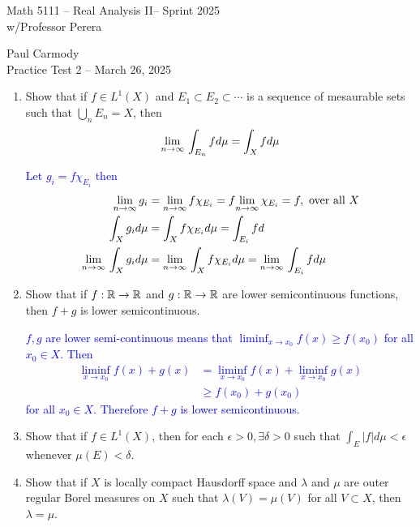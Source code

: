 \documentclass[10pt,a4paper]{report}
\newcommand{\CLASSNAME}{Math 5111 -- Real Analysis II}
\newcommand{\STUDENTNAME}{Paul Carmody}
\newcommand{\ASSIGNMENT}{Practice Test 2 }
\newcommand{\DUEDATE}{March 26, 2025}
\newcommand{\SEMESTER}{Sprint 2025}
\newcommand{\BLUE}[1]{\textcolor{blue}{#1}}
\begin{document}
\begin{center}
	\Large{\CLASSNAME -- \SEMESTER} \\
	\large{ w/Professor Perera}
\end{center}
\begin{center}
	\STUDENTNAME \\
	\ASSIGNMENT -- \DUEDATE\\
\end{center} 

\begin{enumerate}
	\item Show that if $f \in L^1(X)$ and $E_1\subset E_2\subset \cdots$ is a sequence of mesaurable sets such that $\bigcup_{n} E_n=X$, then 
	\begin{align*}
		\underset{n \to \infty}\lim\, \int_{E_n} f d\mu = \int_X f d\mu 
	\end{align*}
	
	\BLUE{Let $g_i = f\chi_{E_i}$ then 
	\begin{align*}
		\underset{n \to \infty}\lim\, g_i &= \underset{n \to \infty}\lim\, f\chi_{E_i}= f\underset{n \to \infty}\lim\, \chi_{E_i} = f, \text{ over all }X\\
		\int_X g_i d\mu &= \int_X f\chi_{E_i} d\mu = \int_{E_i} f d\\
		\underset{n \to \infty}\lim\, \int_X g_i d\mu &= \underset{n \to \infty}\lim\, \int_X f\chi_{E_i} d\mu = \underset{n \to \infty}\lim\, \int_{E_i} f d\mu  \\
	\end{align*}
	}
	
	\item Show that if $f: \mathbb{R} \to \mathbb{R}$ and $g: \mathbb{R} \to \mathbb{R}$ are lower semicontinuous functions, then $f+g$ is lower semicontinuous.

	\BLUE{$f,g$ are lower semi-continuous means that $\liminf_{x\to x_0} f(x) \ge f(x_0)$ for all $x_0 \in X$.  Then 
	\begin{align*}
		\liminf_{x\to x_0} f(x)+g(x) &= \liminf_{x\to x_0} f(x)+ \liminf_{x\to x_0} g(x) \\
		&\ge f(x_0) + g(x_0)
	\end{align*}for all $x_0 \in X$.  Therefore $f+g$ is lower semicontinuous.
	}	
	
	\item Show that if $f \in L^1(X)$, then for each $\epsilon > 0, \exists \delta > 0$ such that $\int_E|f|d\mu < \epsilon$ whenever $\mu(E)<\delta$.
	\item Show that if $X$ is locally compact Hausdorff space and $\lambda$ and $\mu$ are outer regular Borel measures on $X$ such that $\lambda(V)=\mu(V)$ for all $V\subset X$, then $\lambda = \mu$.
	
\end{enumerate}
\end{document}
